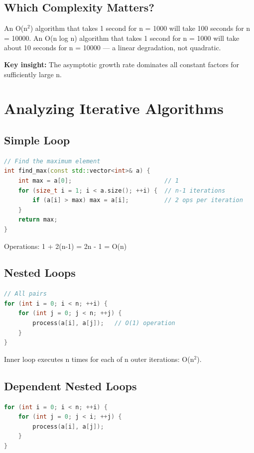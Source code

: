 \subsection{Which Complexity Matters?}

An O(n$^{2}$) algorithm that takes 1 second for n = 1000 will take 100 seconds for n = 10000. An O(n log n) algorithm that takes 1 second for n = 1000 will take about 10 seconds for n = 10000 — a linear degradation, not quadratic.

\textbf{Key insight:} The asymptotic growth rate dominates all constant factors for sufficiently large n.

\section{Analyzing Iterative Algorithms}

\subsection{Simple Loop}

\begin{lstlisting}[language=C++]
// Find the maximum element
int find_max(const std::vector<int>& a) {
    int max = a[0];                          // 1
    for (size_t i = 1; i < a.size(); ++i) {  // n-1 iterations
        if (a[i] > max) max = a[i];          // 2 ops per iteration
    }
    return max;
}
\end{lstlisting}

Operations: 1 + 2(n-1) = 2n - 1 = O(n)

\subsection{Nested Loops}

\begin{lstlisting}[language=C++]
// All pairs
for (int i = 0; i < n; ++i) {
    for (int j = 0; j < n; ++j) {
        process(a[i], a[j]);   // O(1) operation
    }
}
\end{lstlisting}

Inner loop executes n times for each of n outer iterations: O(n$^{2}$).

\subsection{Dependent Nested Loops}

\begin{lstlisting}[language=C++]
for (int i = 0; i < n; ++i) {
    for (int j = 0; j < i; ++j) {
        process(a[i], a[j]);
    }
}
\end{lstlisting}

